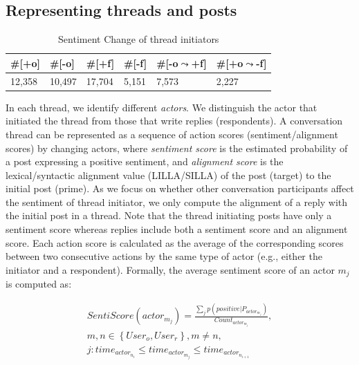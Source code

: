 \documentclass[man,biblatex,floatsintext]{apa6}
\newcommand{\up}{\vspace*{-12pt}}
\begin{document}
\subsection{Representing threads and posts}

\begin{table}[]
\centering
\begin{tabular}{|l|l|l|l|l|l|}
\hline
\#{[}+o{]} & \#{[}-o{]} & \#{[}+f{]} & \#{[}-f{]} & \#{[}-o$\leadsto$+f{]} & \#{[}+o$\leadsto$-f{]} \\ \hline
12,358        &    10,497        &   17,704         &       5,151     &        7,573                   &               2,227            \\ \hline
\end{tabular}
\caption{\label{tab:SentiChange}Sentiment Change of thread initiators}
\up
\end{table}

In each thread, we identify different \emph{actors}.  We distinguish the actor that initiated the thread from those that write replies (respondents). A conversation thread can be represented as a sequence of action scores (sentiment/alignment scores) by changing actors, where \emph{sentiment score} is the estimated probability of a post expressing a positive sentiment, and \emph{alignment score} is the lexical/syntactic alignment value (LILLA/SILLA) of the post (target) to the initial post (prime). As we focus on whether other conversation participants affect the sentiment of thread initiator, we only compute the alignment of a reply with the initial post in a thread. Note that the thread initiating posts have only a sentiment score whereas replies include both a sentiment score and an alignment score. Each action score is calculated as the average of the corresponding scores between two consecutive actions by the same type of actor (e.g., either the initiator and a respondent). Formally, the average sentiment score of an actor $m_{j}$ is computed as:

\begin{equation}
\begin{split}
SentiScore(actor_{m_{j}}) = \frac{\sum_{j}  p(positive|P_{actor_{m_{j}}})}{Count_{actor_{m_{j}}}},\\ m,n \in \left \{User_{o}, User_{r} \right \}, m \neq n, \\ j:time_{actor_{n_{i}}} \leq time_{actor_{m_{j}}} \leq time_{actor_{n_{i+1}}}
\end{split}
\end{equation}
\end{document}
